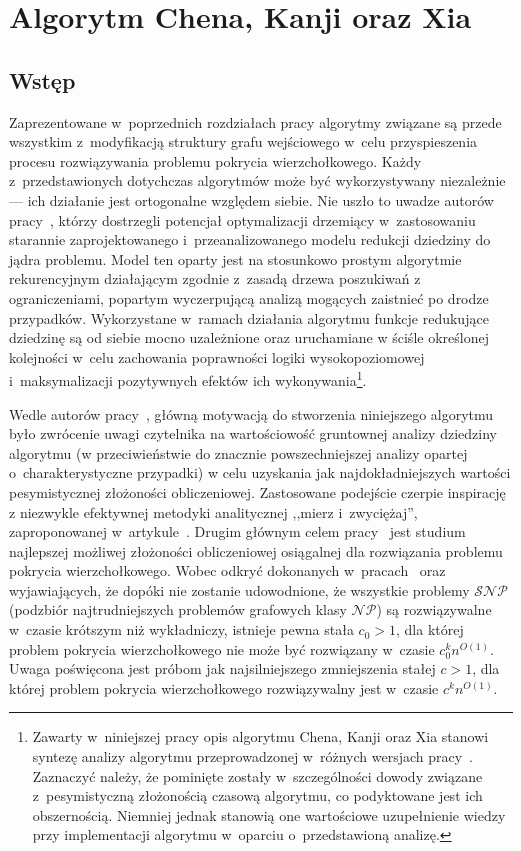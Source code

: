 \section{Algorytm Chena, Kanji oraz Xia}\label{s_ckx}
\subsection{Wstęp}
\par{
  Zaprezentowane w~poprzednich rozdziałach pracy algorytmy związane są przede wszystkim z~modyfikacją struktury grafu wejściowego w~celu przyspieszenia procesu rozwiązywania problemu pokrycia wierzchołkowego.
  Każdy z~przedstawionych dotychczas algorytmów może być wykorzystywany niezależnie --- ich działanie jest ortogonalne względem siebie.
  Nie uszło to uwadze autorów pracy~\cite{ImprovedBounds10}, którzy dostrzegli potencjał optymalizacji drzemiący w~zastosowaniu starannie zaprojektowanego i~przeanalizowanego modelu redukcji dziedziny do jądra problemu.
  Model ten oparty jest na stosunkowo prostym algorytmie rekurencyjnym działającym zgodnie z~zasadą drzewa poszukiwań z ograniczeniami, popartym wyczerpującą analizą mogących zaistnieć po drodze przypadków.
  Wykorzystane w~ramach działania algorytmu funkcje redukujące dziedzinę są od siebie mocno uzależnione oraz uruchamiane w ściśle określonej kolejności w~celu zachowania poprawności logiki wysokopoziomowej i~maksymalizacji pozytywnych efektów ich wykonywania\footnote{Zawarty w~niniejszej pracy opis algorytmu Chena, Kanji oraz Xia stanowi syntezę analizy algorytmu przeprowadzonej w~różnych wersjach pracy~\cite{ImprovedBounds10}. Zaznaczyć należy, że pominięte zostały w~szczególności dowody związane z~pesymistyczną złożonością czasową algorytmu, co podyktowane jest ich obszernością. Niemniej jednak stanowią one wartościowe uzupełnienie wiedzy przy implementacji algorytmu w~oparciu o~przedstawioną analizę.}.
}
\par{
  Wedle autorów pracy~\cite{ImprovedBounds10}, główną motywacją do stworzenia niniejszego algorytmu było zwrócenie uwagi czytelnika na wartościowość gruntownej analizy dziedziny algorytmu (w przeciwieństwie do znacznie powszechniejszej analizy opartej o~charakterystyczne przypadki) w celu uzyskania jak najdokładniejszych wartości pesymistycznej złożoności obliczeniowej.
  Zastosowane podejście czerpie inspirację z niezwykle efektywnej metodyki analitycznej ,,mierz i~zwyciężaj'', zaproponowanej w~artykule~\cite{conf/icalp/FominGK05}.
  Drugim głównym celem pracy~\cite{ImprovedBounds10} jest studium najlepszej możliwej złożoności obliczeniowej osiągalnej dla rozwiązania problemu pokrycia wierzchołkowego.
  Wobec odkryć dokonanych w~pracach~\cite{Impagliazzo2001512} oraz~\cite{Cai2003789} wyjawiających, że dopóki nie zostanie udowodnione, że wszystkie problemy $\mathcal{SNP}$ (podzbiór najtrudniejszych problemów grafowych klasy $\mathcal{NP}$) są rozwiązywalne w~czasie krótszym niż wykładniczy, istnieje pewna stała $c_0 > 1$, dla której problem pokrycia wierzchołkowego nie może być rozwiązany w~czasie $c_0^kn^{O(1)}$.
  Uwaga poświęcona jest próbom jak najsilniejszego zmniejszenia stałej $c > 1$, dla której problem pokrycia wierzchołkowego rozwiązywalny jest w~czasie $c^kn^{O(1)}$.
}
